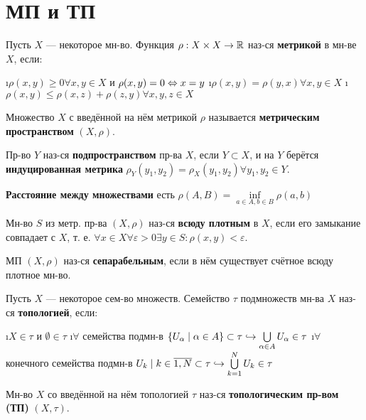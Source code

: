 

\usepackage{tikz}

\newcommand{\ra}{\rightarrow}
\newcommand{\cross}{\times}
\newcommand{\bf}{\textbf}
\newcommand{\eps}{\varepsilon}
\newcommand{\norm}[1]{\left\lVert#1\right\rVert}
\newcommand{\wave}{\tilde}



\section{МП и ТП}

\begin{defn}
Пусть $X$ --- некоторое мн-во. Функция $\rho:X \cross X \ra \R$ наз-ся \textbf{метрикой} в мн-ве $X$, если:
\begin{enumerate}
	\i $\rho(x, y) \ge 0 \forall x, y \in X$ и $\rho(x, y) = 0 \Leftrightarrow x=y$
	\i $\rho(x, y) = \rho(y, x) \forall x, y \in X$
	\i $\rho(x, y) \le \rho(x, z)+\rho(z, y) \forall x, y, z \in X$
\end{enumerate}
Множество $X$ с введённой на нём метрикой $\rho$ называется \bf{метрическим пространством} $(X, \rho)$.
\end{defn}

\begin{defn}
Пр-во $Y$ наз-ся \bf{подпространством} пр-ва $X$, если $Y \subset X$, и на $Y$ берётся \bf{индуцированная метрика} $\rho_Y(y_1, y_2) = \rho_X(y_1, y_2) \forall y_1, y_2 \in Y$. 
\end{defn}

\begin{defn}
\bf{Расстояние между множествами} есть $\rho(A, B) = \inf\limits_{a \in A, b \in B} \rho(a, b)$
\end{defn}

\begin{defn}
Мн-во $S$ из метр. пр-ва $(X, \rho)$ наз-ся \bf{всюду плотным} в $X$, если его замыкание совпадает с $X$, т. е. $\forall x \in X \forall \eps > 0 \exists y \in S: \rho(x, y)<\eps$.	
\end{defn}

\begin{defn}
МП $(X, \rho)$ наз-ся \bf{сепарабельным}, если в нём существует счётное всюду плотное мн-во. 
\end{defn}

\begin{defn}
Пусть $X$ --- некоторое сем-во множеств. Семейство $\tau$ подмножеств мн-ва $X$ наз-ся \bf{топологией}, если:
\begin{enumerate}
\i $X \in \tau$ и $\emptyset \in \tau$
\i $\forall$ семейства подмн-в $\{U_\alpha \mid \alpha \in A\} \subset \tau \hookrightarrow \bigcup\limits_{\alpha \in A} U_\alpha \in \tau$
\i $\forall$ конечного семейства подмн-в ${U_k \mid k \in \overline{1,N}} \subset \tau \hookrightarrow \bigcup\limits_{k=1}^N U_k \in \tau$
\end{enumerate}
Мн-во $X$ со введённой на нём топологией $\tau$ наз-ся \bf{топологическим пр-вом (ТП)} $(X, \tau)$.
\end{defn}


